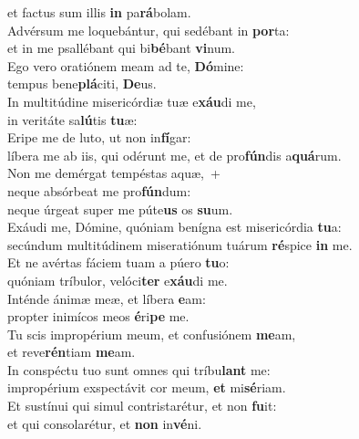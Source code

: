 \evenverse et factus sum illis \textbf{in} pa\textbf{rá}bolam.\\
\oddverse Advérsum me loquebántur, qui sedébant in \textbf{por}ta:~\*\\
\oddverse et in me psallébant qui bi\textbf{bé}bant \textbf{vi}num.\\
\evenverse Ego vero oratiónem meam ad te, \textbf{Dó}mine:~\*\\
\evenverse tempus bene\textbf{plá}citi, \textbf{De}us.\\
\oddverse In multitúdine misericórdiæ tuæ e\textbf{xáu}di me,~\*\\
\oddverse in veritáte sa\textbf{lú}tis \textbf{tu}æ:\\
\evenverse Eripe me de luto, ut non in\textbf{fí}gar:~\*\\
\evenverse líbera me ab iis, qui odérunt me, et de pro\textbf{fún}dis a\textbf{quá}rum.\\
\oddverse Non me demérgat tempéstas aquæ,~+\\
\oddverse  neque absórbeat me pro\textbf{fún}dum:~\*\\
\oddverse neque úrgeat super me púte\textbf{us} os \textbf{su}um.\\
\evenverse Exáudi me, Dómine, quóniam benígna est misericórdia \textbf{tu}a:~\*\\
\evenverse secúndum multitúdinem miseratiónum tuárum \textbf{ré}spice \textbf{in} me.\\
\oddverse Et ne avértas fáciem tuam a púero \textbf{tu}o:~\*\\
\oddverse quóniam tríbulor, velóci\textbf{ter} e\textbf{xáu}di me.\\
\evenverse Inténde ánimæ meæ, et líbera \textbf{e}am:~\*\\
\evenverse propter inimícos meos \textbf{é}ri\textbf{pe} me.\\
\oddverse Tu scis impropérium meum, et confusiónem \textbf{me}am,~\*\\
\oddverse et reve\textbf{rén}tiam \textbf{me}am.\\
\evenverse In conspéctu tuo sunt omnes qui tríbu\textbf{lant} me:~\*\\
\evenverse impropérium exspectávit cor meum, \textbf{et} mi\textbf{sé}riam.\\
\oddverse Et sustínui qui simul contristarétur, et non \textbf{fu}it:~\*\\
\oddverse et qui consolarétur, et \textbf{non} in\textbf{vé}ni.\\
